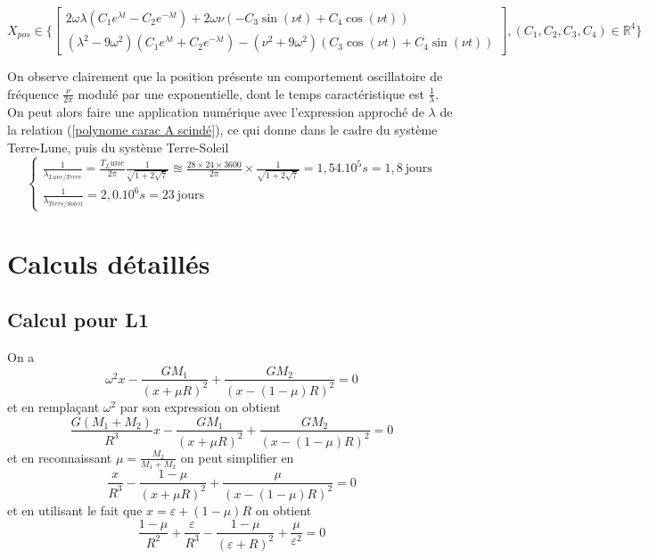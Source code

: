 \documentclass[12pt]{article}
\begin{document}
	\begin{equation}
		X_{pos} \in \{
		\begin{bmatrix}
			2\omega\lambda(C_1e^{\lambda t} - C_2e^{-\lambda t}) + 2\omega\nu(-C_3\sin(\nu t) + C_4\cos(\nu t))
			\\
			(\lambda^2 - 9\omega^2)(C_1e^{\lambda t} + C_2e^{-\lambda t}) - (\nu^2+9\omega^2)(C_3\cos(\nu t) + C_4\sin(\nu t))
		\end{bmatrix},
		(C_1,C_2,C_3,C_4) \in \mathbb{R}^4
		\}
	\end{equation}
	
	On observe clairement que la position présente un comportement oscillatoire de fréquence $\frac{\nu}{2\pi}$ modulé par une exponentielle, dont le temps caractéristique est $\frac{1}{\lambda}$. On peut alors faire une application numérique avec l'expression approché de $\lambda$ de la relation (\ref{polynome carac A scindé}), ce qui donne dans le cadre du système Terre-Lune, puis du système Terre-Soleil
	\begin{equation}
		\begin{cases}
			\frac{1}{\lambda_{Lune/Terre}} = \frac{T_Lune}{2\pi}\frac{1}{\sqrt{1+2\sqrt{7}}} \approxeq \frac{28\times24\times3600}{2\pi}\times\frac{1}{\sqrt{1+2\sqrt{7}}} = 1,54.10^{5}s = 1,8 \ \text{jours}
			\\
			\frac{1}{\lambda_{Terre/Soleil}} = 2,0.10^6s = 23 \ \text{jours}
		\end{cases}
	\end{equation}
	
	\clearpage
	\section*{Calculs détaillés}
	\subsection*{Calcul pour L1}
	On a
	\begin{equation*}
		\omega^2x - \frac{GM_1}{(x+\mu R)^2} + \frac{GM_2}{(x-(1-\mu)R)^2} = 0
	\end{equation*}
	et en remplaçant $\omega^2$ par son expression on obtient
	\begin{equation*}
		\frac{G(M_1 + M_2)}{R^3}x - \frac{GM_1}{(x+\mu R)^2} + \frac{GM_2}{(x-(1-\mu)R)^2} = 0
	\end{equation*}
	et en reconnaissant $\mu = \frac{M_2}{M_1+M_2}$ on peut simplifier en
		\begin{equation*}
		\frac{x}{R^3} - \frac{1-\mu}{(x+\mu R)^2} + \frac{\mu}{(x-(1-\mu)R)^2} = 0
	\end{equation*}
	et en utilisant le fait que $x=\varepsilon + (1-\mu)R$ on obtient
	\begin{equation*}
		\frac{1-\mu}{R^2} + \frac{\varepsilon}{R^3} - \frac{1-\mu}{(\varepsilon+R)^2} + \frac{\mu}{\varepsilon^2} = 0
	\end{equation*}
	
\end{document}
